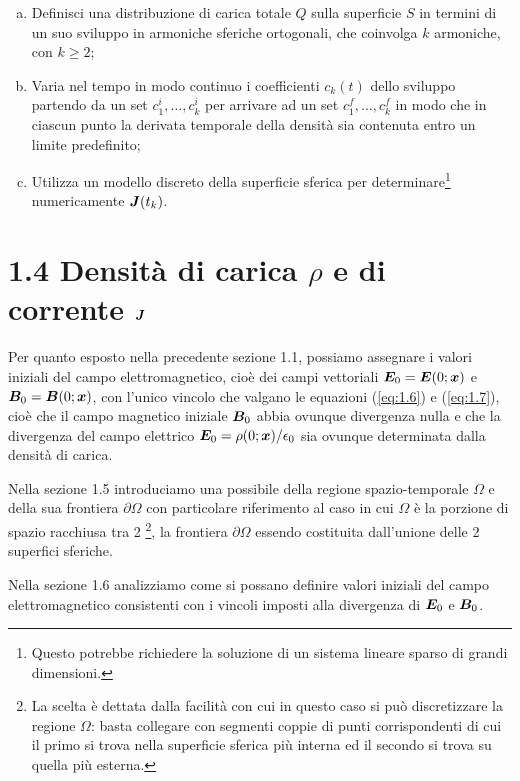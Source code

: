 \begin{enumerate}[(I)]
\begin{enumerate}[(a)]
	\item Definisci una distribuzione di carica totale $Q$ sulla superficie $S$ in termini di un  suo sviluppo in armoniche sferiche ortogonali, che coinvolga $k$ armoniche, con $k \geq 2$;  
	\item Varia nel tempo in modo continuo i coefficienti $c_k(t)$ dello sviluppo partendo da un set  $c^{i}_1, \ldots, c^{i}_k$ per arrivare ad un set  $c^{f}_1, \ldots, c^{f}_k$ in modo che in ciascun punto la derivata temporale della densità sia contenuta entro un limite predefinito;
	\item Utilizza un modello discreto della superficie sferica per determinare\footnote{Questo potrebbe richiedere la soluzione di un sistema lineare sparso di grandi dimensioni.} numericamente $\vb*{J}(t_k)$.
	\end{enumerate}
\end{enumerate}
\pagebreak
\section*{1.4 Densità di carica $\rho$ e di corrente $\vb*{J}$}\label{sec_1.4}
Per quanto esposto nella precedente sezione 1.1, possiamo assegnare i valori iniziali del campo elettromagnetico, cioè dei campi vettoriali $\vb*{E}_0 = \vb*{E}(0; \vb*{x})$ e $\vb*{B}_0 = \vb*{B}(0; \vb*{x})$, con l'unico vincolo che valgano le equazioni (\ref{eq:1.6}) e (\ref{eq:1.7}), cioè che il campo magnetico iniziale $\vb*{B}_0$ abbia ovunque divergenza nulla e che la divergenza del campo elettrico $\vb*{E}_0 = \rho(0; \vb*{x})/\epsilon_0$ sia ovunque determinata dalla densità di carica. 

Nella sezione 1.5 introduciamo una possibile  della regione spazio-temporale $\Omega$ e della sua frontiera $\partial \Omega$ con particolare riferimento al caso in cui $\Omega$ è la porzione di spazio racchiusa tra 2 \footnote{La scelta è dettata dalla facilità con cui in questo caso si può discretizzare la regione $\Omega$: basta collegare con segmenti  coppie di punti corrispondenti di cui il primo si trova nella superficie sferica più interna ed il secondo si trova su quella più esterna.}, la frontiera $\partial \Omega$ essendo costituita dall'unione delle 2 superfici sferiche. 

Nella sezione 1.6 analizziamo come si possano definire valori iniziali del campo elettromagnetico consistenti con i vincoli imposti alla divergenza di $\vb*{E}_0$ e $\vb*{B}_0$.

